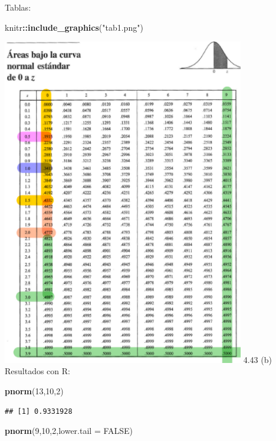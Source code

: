 \documentclass[
]{article}
\newenvironment{Shaded}{\begin{snugshade}}{\end{snugshade}}
\newcommand{\DataTypeTok}[1]{\textcolor[rgb]{0.13,0.29,0.53}{#1}}
\newcommand{\DecValTok}[1]{\textcolor[rgb]{0.00,0.00,0.81}{#1}}
\newcommand{\KeywordTok}[1]{\textcolor[rgb]{0.13,0.29,0.53}{\textbf{#1}}}
\newcommand{\NormalTok}[1]{#1}
\newcommand{\OperatorTok}[1]{\textcolor[rgb]{0.81,0.36,0.00}{\textbf{#1}}}
\newcommand{\OtherTok}[1]{\textcolor[rgb]{0.56,0.35,0.01}{#1}}
\newcommand{\StringTok}[1]{\textcolor[rgb]{0.31,0.60,0.02}{#1}}
\begin{document}
Tablas:

\begin{Shaded}
\begin{Highlighting}[]
\NormalTok{ knitr}\OperatorTok{::}\KeywordTok{include_graphics}\NormalTok{(}\StringTok{"tab1.png"}\NormalTok{)}
\end{Highlighting}
\end{Shaded}

\includegraphics[width=400px]{tab1} 4.43 (b) Resultados con R:

\begin{Shaded}
\begin{Highlighting}[]
\KeywordTok{pnorm}\NormalTok{(}\DecValTok{13}\NormalTok{,}\DecValTok{10}\NormalTok{,}\DecValTok{2}\NormalTok{)}
\end{Highlighting}
\end{Shaded}

\begin{verbatim}
## [1] 0.9331928
\end{verbatim}

\begin{Shaded}
\begin{Highlighting}[]
\KeywordTok{pnorm}\NormalTok{(}\DecValTok{9}\NormalTok{,}\DecValTok{10}\NormalTok{,}\DecValTok{2}\NormalTok{,}\DataTypeTok{lower.tail =} \OtherTok{FALSE}\NormalTok{)}
\end{Highlighting}
\end{Shaded}
\end{document}
